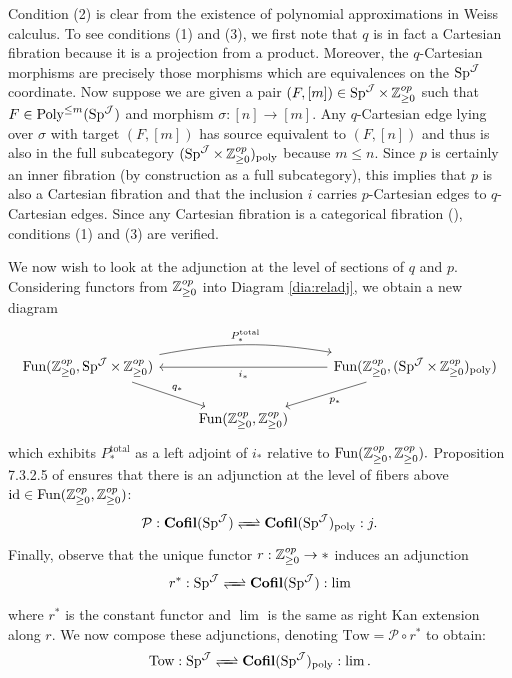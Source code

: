 \begin{cnstr}
Condition (2) is clear from the existence of polynomial approximations in Weiss calculus.  To see conditions (1) and (3), we first note that $q$ is in fact a Cartesian fibration because it is a projection from a product.  Moreover, the $q$-Cartesian morphisms are precisely those morphisms which are equivalences on the $\operatorname{\mathrm{Sp}}^{\operatorname{\mathcal{J}}}$ coordinate.  
Now suppose we are given a pair $(F, [m]) \in \operatorname{\mathrm{Sp}}^{\operatorname{\mathcal{J}}}\times \operatorname{\mathbb{Z}}^{op}_{\geq 0}$ such that $F\in \operatorname{\text{Poly}}^{\leq m}(\operatorname{\mathrm{Sp}}^{\operatorname{\mathcal{J}}})$ and morphism $\sigma :[n]\to [m]$.  Any $q$-Cartesian edge lying over $\sigma$ with target $(F, [m])$ has source equivalent to $(F, [n])$ and thus is also in the full subcategory $(\operatorname{\mathrm{Sp}}^{\operatorname{\mathcal{J}}}\times \operatorname{\mathbb{Z}}^{op}_{\geq 0})_{\text{poly}}$ because $m\leq n$.   
Since $p$ is certainly an inner fibration (by construction as a full subcategory), this implies that $p$ is also a Cartesian fibration and that the inclusion $i$ carries $p$-Cartesian edges to $q$-Cartesian edges.  Since any Cartesian fibration is a categorical fibration (\cite[Proposition 3.3.1.7]{HTT}), conditions (1) and (3) are verified.  

We now wish to look at the adjunction at the level of sections of $q$ and $p$.  Considering functors from $\operatorname{\mathbb{Z}}_{\geq 0}^{op}$ into Diagram \ref{dia:reladj}, we obtain a new diagram 
$$
\begin{tikzcd}
\Fun(\Z^{op}_{\geq 0},\Sp^{\J}\times \Z^{op}_{\geq 0}) \arrow[rr, bend left=10,"P^{\text{total}}_*"] \arrow[rd,"q_*"]& &\Fun(\Z^{op}_{\geq 0},(\Sp^{\J}\times \Z^{op}_{\geq 0})_{\text{poly}}) \arrow[ld,"p_*"]\arrow[ll,"i_*"]  \\
& \Fun(\Z^{op}_{\geq 0}, \Z^{op}_{\geq 0})
\end{tikzcd}
$$
which exhibits $P^{\text{total}}_*$ as a left adjoint of $i_*$ relative to $\operatorname{\text{Fun}}(\operatorname{\mathbb{Z}}_{\geq 0}^{op},\operatorname{\mathbb{Z}}_{\geq 0}^{op}).$  Proposition 7.3.2.5 of \cite{HA} ensures that there is an adjunction at the level of fibers above $\text{id}\in \operatorname{\text{Fun}}(\operatorname{\mathbb{Z}}_{\geq 0}^{op},\operatorname{\mathbb{Z}}_{\geq 0}^{op})$: $$\mathcal{P}: \Cofil(\Sp^{\J}) \xrightleftharpoons{\quad} \Cofil(\Sp^{\J})_{\text{poly}}:j .$$  
Finally, observe that the unique functor $r: \operatorname{\mathbb{Z}}^{op}_{\geq 0} \to *$ induces an adjunction $$r^*: \Sp^{\J} \xrightleftharpoons{\quad} \Cofil(\Sp^{\J}): \lim$$ where $r^*$ is the constant functor and $\lim$ is the same as right Kan extension along $r$.  We now compose these adjunctions, denoting $\text{Tow} = \mathcal{P}\circ r^*$ to obtain: $$\text{Tow}: \Sp^{\J} \xrightleftharpoons{\quad}  \Cofil(\Sp^{\J})_{\text{poly}}: \lim.$$


\end{cnstr}
